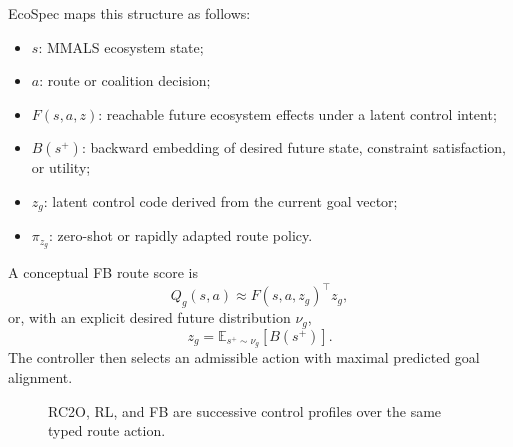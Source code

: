 \documentclass[10pt]{article}
\newcommand{\E}{\mathbb{E}}
\begin{document}
EcoSpec maps this structure as follows:
\begin{itemize}
  \item $s$: MMALS ecosystem state;
  \item $a$: route or coalition decision;
  \item $F(s,a,z)$: reachable future ecosystem effects under a latent control intent;
  \item $B(s^+)$: backward embedding of desired future state, constraint satisfaction, or utility;
  \item $z_g$: latent control code derived from the current goal vector;
  \item $\pi_{z_g}$: zero-shot or rapidly adapted route policy.
\end{itemize}

A conceptual FB route score is
\begin{equation}
  Q_g(s,a)\approx F(s,a,z_g)^\top z_g,
  \label{eq:fbscore}
\end{equation}
or, with an explicit desired future distribution $\nu_g$,
\begin{equation}
  z_g=\E_{s^+\sim\nu_g}[B(s^+)].
\end{equation}
The controller then selects an admissible action with maximal predicted goal alignment.

\begin{figure}[h]
\centering
{}
\caption{RC2O, RL, and FB are successive control profiles over the same typed route action.}
\label{fig:controlprofiles}
\end{figure}
\end{document}
